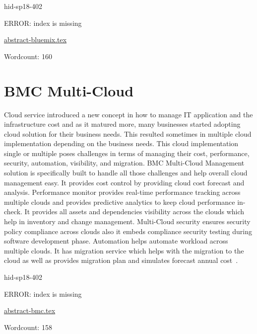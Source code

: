 \begin{IU}

hid-sp18-402

ERROR: index is missing

\href{https://github.com/cloudmesh-community/hid-sp18-402/blob/master//technology/abstract-bluemix.tex}{abstract-bluemix.tex}

 

Wordcount: 160

\end{IU}

\section{BMC Multi-Cloud}
Cloud service introduced a new concept in how to manage IT application
and the infrastructure cost and as it matured more, many businesses
started adopting cloud solution for their business needs. This
resulted sometimes in multiple cloud implementation depending on the
business needs. This cloud implementation single or multiple poses
challenges in terms of managing their cost, performance, security,
automation, visibility, and migration. BMC Multi-Cloud Management
solution is specifically built to handle all those challenges and
help overall cloud management easy. It provides cost control by
providing cloud cost forecast and analysis. Performance monitor
provides real-time performance tracking across multiple clouds and
provides predictive analytics to keep cloud performance in-check. It
provides all assets and dependencies visibility across the clouds which help in
inventory and change management. Multi-Cloud security ensures security
policy compliance across clouds also it embeds compliance security testing
during software development phase. Automation helps automate workload across multiple
clouds. It has migration service which helps with the migration to the
cloud as well as provides migration plan and simulates forecast annual
cost~\cite{hid-sp18-402-bmc}.


\begin{IU}

hid-sp18-402

ERROR: index is missing

\href{https://github.com/cloudmesh-community/hid-sp18-402/blob/master//technology/abstract-bmc.tex}{abstract-bmc.tex}

 

Wordcount: 158

\end{IU}

